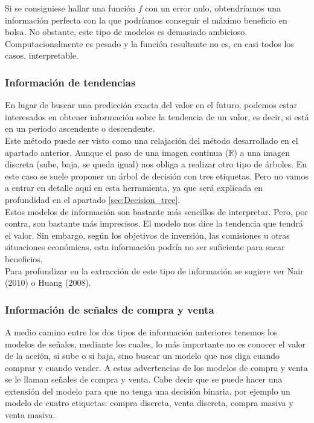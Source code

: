      Si se consiguiese hallar una funci\'on $f$ con un error nulo, obtendr\'iamos una informaci\'on perfecta con la que podr\'iamos conseguir el m\'aximo beneficio en bolsa. No obstante, este tipo de modelos es demasiado ambicioso. Computacionalmente es pesado y la funci\'on resultante no es, en casi todos los casos, interpretable.\\
     
     
     \subsubsection{Informaci\'on de tendencias}
     
     En lugar de buscar una predicci\'on exacta del valor en el futuro, podemos estar interesados en obtener informaci\'on sobre la tendencia de un valor, es decir, si est\'a en un periodo ascendente o descendente. \\
     
     Este m\'etodo puede ser visto como una relajaci\'on del m\'etodo desarrollado en el apartado anterior. Aunque el paso de una imagen continua ($\mathbb{R}$) a una imagen discreta (sube, baja, se queda igual) nos obliga a realizar otro tipo de \'arboles. En este caso se suele proponer un \'arbol de decisi\'on con tres etiquetas. Pero no vamos a entrar en detalle aqu\'i en esta herramienta, ya que ser\'a explicada en profundidad en el apartado \ref{sec:Decision_tree}.\\
     
     Estos modelos de informaci\'on son bastante m\'as sencillos de interpretar. Pero, por contra, son bastante m\'as imprecisos. El modelo nos dice la tendencia que tendr\'a el valor. Sin embargo, seg\'un los objetivos de inversi\'on, las comisiones u otras situaciones econ\'omicas, esta informaci\'on podr\'ia no ser suficiente para sacar beneficios.\\
     
     Para profundizar en la extracci\'on de este tipo de informaci\'on se sugiere ver Nair (2010) o Huang (2008).\\
     
     
     \subsubsection{Informaci\'on de se\~nales de compra y venta}
     
     A medio camino entre los dos tipos de informaci\'on anteriores tenemos los modelos de señales, mediante los cuales, lo m\'as importante no es conocer el valor de la acci\'on, si sube o si baja, sino buscar un modelo que nos diga cuando comprar y cuando vender. A estas advertencias de los modelos de compra y venta se le llaman se\~nales de compra y venta. Cabe decir que se puede hacer una extensi\'on del modelo para que no tenga una decisi\'on binaria, por ejemplo un modelo de cuatro etiquetas: compra discreta, venta discreta, compra masiva y venta masiva. \\
     
